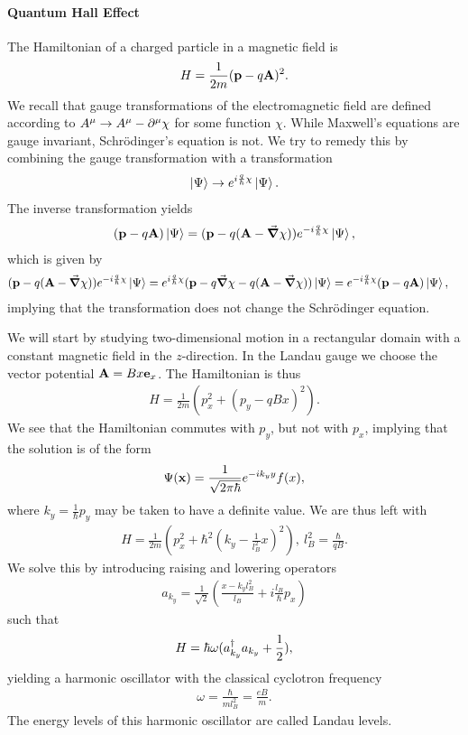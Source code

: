 \paragraph{Quantum Hall Effect}
The Hamiltonian of a charged particle in a magnetic field is
\begin{align*}
	H = \frac{1}{2m}(\vb{p} - q\vb{A})^{2}.
\end{align*}
We recall that gauge transformations of the electromagnetic field are defined according to $A^{\mu} \to A^{\mu} - \del[\mu]{}{\chi}$ for some function $\chi$. While Maxwell's equations are gauge invariant, Schrödinger's equation is not. We try to remedy this by combining the gauge transformation with a transformation
\begin{align*}
	\ket{\Psi} \to e^{i\frac{q}{\hbar}\chi}\ket{\Psi}.
\end{align*}
The inverse transformation yields
\begin{align*}
	(\vb{p} - q\vb{A})\ket{\Psi} = (\vb{p} - q(\vb{A} - \grad{\chi}))e^{-i\frac{q}{\hbar}\chi}\ket{\Psi},
\end{align*}
which is given by
\begin{align*}
	(\vb{p} - q(\vb{A} - \grad{\chi}))e^{-i\frac{q}{\hbar}\chi}\ket{\Psi} &= e^{i\frac{q}{\hbar}\chi}(\vb{p} - q\grad{\chi} - q(\vb{A} - \grad{\chi}))\ket{\Psi} = e^{-i\frac{q}{\hbar}\chi}(\vb{p} - q\vb{A})\ket{\Psi},
\end{align*}
implying that the transformation does not change the Schrödinger equation.

We will start by studying two-dimensional motion in a rectangular domain with a constant magnetic field in the $z$-direction. In the Landau gauge we choose the vector potential $\vb{A} = Bx\ub{x}$. The Hamiltonian is thus
\begin{align*}
	H = \frac{1}{2m}\left(p_{x}^{2} + (p_{y} - qBx)^{2}\right).
\end{align*}
We see that the Hamiltonian commutes with $p_{y}$, but not with $p_{x}$, implying that the solution is of the form
\begin{align*}
	\Psi(\vb{x}) = \frac{1}{\sqrt{2\pi\hbar}}e^{-ik_{y}y}f(x),
\end{align*}
where $k_{y} = \frac{1}{\hbar}p_{y}$ may be taken to have a definite value. We are thus left with
\begin{align*}
	H = \frac{1}{2m}\left(p_{x}^{2} + \hbar^{2}\left(k_{y} - \frac{1}{l_{B}^{2}}x\right)^{2}\right),\ l_{B}^{2} = \frac{\hbar}{qB}.
\end{align*}
We solve this by introducing raising and lowering operators
\begin{align*}
	a_{k_{y}} = \frac{1}{\sqrt{2}}\left(\frac{x - k_{y}l_{B}^{2}}{l_{B}} + i\frac{l_{B}}{\hbar}p_{x}\right)
\end{align*}
such that
\begin{align*}
	H = \hbar\omega(\adj{a_{k_{y}}}a_{k_{y}} + \frac{1}{2}),
\end{align*}
yielding a harmonic oscillator with the classical cyclotron frequency
\begin{align*}
	\omega = \frac{\hbar}{ml_{B}^{2}} = \frac{eB}{m}.
\end{align*}
The energy levels of this harmonic oscillator are called Landau levels.

